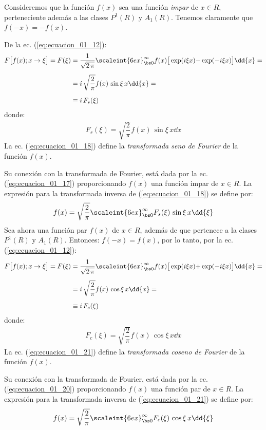 Consideremos que la función $f(x)$ sea una función \emph{impar} de $x \in R$, perteneciente además a las clases $P^{1} (R)$ y $A_{1} (R)$. Tenemos claramente que $f(-x) = - f(x)$. 
\par
De la ec. (\ref{eq:ecuacion_01_12}):
\begin{align}
\begin{aligned}[b]
F \big[ f(x); x \to \xi \big] = F(\xi) &= \dfrac{1}{\sqrt{2 \, \pi}} \scaleint{6ex}_{\bs 0}^{\infty} f(x) \big[ \exp(i \xi x) {-} \exp(-i \xi x) \big] \dd{x} = \\[0.5em]
&= i \, \sqrt{\dfrac{2}{\pi}} f(x) \, \sin \xi \, x \dd{x} = \\[0.5em]
&\equiv i \, F_{s} (\xi)
\end{aligned}
\label{eq:ecuacion_01_17}
\end{align}
donde:
\begin{align}
F_{s} (\xi) = \sqrt{\dfrac{2}{\pi}} f(x) \, \sin \xi \, x \dd{x}
\label{eq:ecuacion_01_18}
\end{align}
La ec. (\ref{eq:ecuacion_01_18}) define la \emph{transformada seno de Fourier} de la función $f(x)$.
\par
Su conexión con la transformada de Fourier, está dada por la ec. (\ref{eq:ecuacion_01_17}) proporcionando $f (x)$ una función impar de $x \in R$. La expresión para la transformada inversa de (\ref{eq:ecuacion_01_18}) se define por:
\begin{align}
f(x) = \sqrt{\dfrac{2}{\pi}} \scaleint{6ex}_{\bs 0}^{\infty} F_{s}(\xi) \, \sin \xi \, x \dd{\xi}
\label{eq:ecuacion_01_19}
\end{align}
Sea ahora una función par $f(x)$ de $x \in R$, además de que pertenece a la clases $P^{1}(R)$ y $A_{1}(R)$. Entonces: $f(-x) = f(x)$, por lo tanto, por la ec. (\ref{eq:ecuacion_01_12}):
\begin{align}
\begin{aligned}[b]
F \big[ f(x); x \to \xi \big] = F(\xi) &= \dfrac{1}{\sqrt{2 \, \pi}} \scaleint{6ex}_{\bs 0}^{\infty} f(x) \big[ \exp(i \xi x) {+} \exp(-i \xi x) \big] \dd{x} = \\[0.5em]
&= i \, \sqrt{\dfrac{2}{\pi}} f(x) \, \cos \xi \, x \dd{x} = \\[0.5em]
&\equiv i \, F_{c} (\xi)    
\end{aligned}
\label{eq:ecuacion_01_20}
\end{align}
donde:
\begin{align}
F_{c} (\xi) = \sqrt{\dfrac{2}{\pi}} f(x) \, \cos \xi \, x \dd{x}
\label{eq:ecuacion_01_21}
\end{align}
La ec. (\ref{eq:ecuacion_01_21}) define la \emph{transformada coseno de Fourier} de la función $f(x)$.
\par
Su conexión con la transformada de Fourier, está dada por la ec. (\ref{eq:ecuacion_01_20}) proporcionando $f (x)$ una función par de $x \in R$. La expresión para la transformada inversa de (\ref{eq:ecuacion_01_21}) se define por:
\begin{align}
f(x) = \sqrt{\dfrac{2}{\pi}} \scaleint{6ex}_{\bs 0}^{\infty} F_{c}(\xi) \, \cos \xi \, x \dd{\xi}
\label{eq:ecuacion_01_22}
\end{align}


